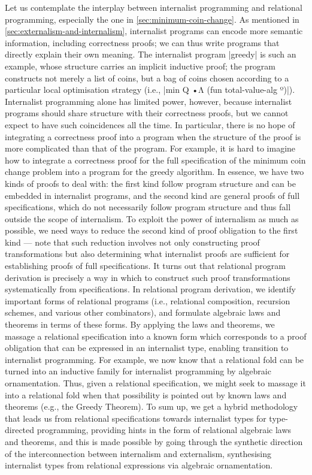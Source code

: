 Let us contemplate the interplay between internalist programming and relational programming, especially the one in \autoref{sec:minimum-coin-change}.
As mentioned in \autoref{sec:externalism-and-internalism}, internalist programs can encode more semantic information, including correctness proofs; we can thus write programs that directly explain their own meaning.
The internalist program |greedy| is such an example, whose structure carries an implicit inductive proof; the program constructs not merely a list of coins, but a bag of coins chosen according to a particular local optimisation strategy (i.e., |min Q •Λ (fun total-value-alg º)|).
Internalist programming alone has limited power, however, because internalist programs should share structure with their correctness proofs, but we cannot expect to have such coincidences all the time.
In particular, there is no hope of integrating a correctness proof into a program when the structure of the proof is more complicated than that of the program.
For example, it is hard to imagine how to integrate a correctness proof for the full specification of the minimum coin change problem into a program for the greedy algorithm.
In essence, we have two kinds of proofs to deal with: the first kind follow program structure and can be embedded in internalist programs, and the second kind are general proofs of full specifications, which do not necessarily follow program structure and thus fall outside the scope of internalism.
To exploit the power of internalism as much as possible, we need ways to reduce the second kind of proof obligation to the first kind --- note that such reduction involves not only constructing proof transformations but also determining what internalist proofs are sufficient for establishing proofs of full specifications.
It turns out that relational program derivation is precisely a way in which to construct such proof transformations systematically from specifications.
In relational program derivation, we identify important forms of relational programs (i.e., relational composition, recursion schemes, and various other combinators), and formulate algebraic laws and theorems in terms of these forms.
By applying the laws and theorems, we massage a relational specification into a known form which corresponds to a proof obligation that can be expressed in an internalist type, enabling transition to internalist programming.
For example, we now know that a relational fold can be turned into an inductive family for internalist programming by algebraic ornamentation.
Thus, given a relational specification, we might seek to massage it into a relational fold when that possibility is pointed out by known laws and theorems (e.g., the Greedy Theorem).
To sum up, we get a hybrid methodology that leads us from relational specifications towards internalist types for type-directed programming, providing hints in the form of relational algebraic laws and theorems, and this is made possible by going through the synthetic direction of the interconnection between internalism and externalism, synthesising internalist types from relational expressions via algebraic ornamentation.
